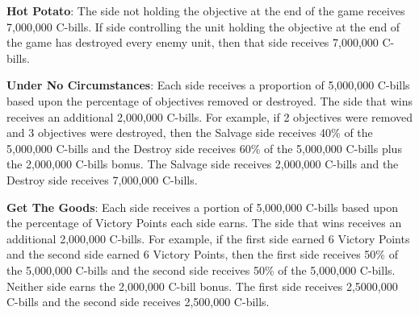 \begin{description}
\item {\bfseries Hot Potato}: The side not holding the objective at the end of the game receives 7,000,000 C-bills.
If side controlling the unit holding the objective at the end of the game has destroyed every enemy unit, then that side receives 7,000,000 C-bills.

\item {\bfseries Under No Circumstances}: Each side receives a proportion of 5,000,000 C-bills based upon the percentage of objectives removed or destroyed.
The side that wins receives an additional 2,000,000 C-bills.
For example, if 2 objectives were removed and 3 objectives were destroyed, then the Salvage side receives 40\% of the 5,000,000 C-bills and the Destroy side receives 60\% of the 5,000,000 C-bills plus the 2,000,000 C-bills bonus.
The Salvage side receives 2,000,000 C-bills and the Destroy side receives 7,000,000 C-bills.

\item {\bfseries Get The Goods}: Each side receives a portion of 5,000,000 C-bills based upon the percentage of Victory Points each side earns.
The side that wins receives an additional 2,000,000 C-bills.
For example, if the first side earned 6 Victory Points and the second side earned 6 Victory Points, then the first side receives 50\% of the 5,000,000 C-bills and the second side receives 50\% of the 5,000,000 C-bills.
Neither side earns the 2,000,000 C-bill bonus.
The first side receives 2,5000,000 C-bills and the second side receives 2,500,000 C-bills.

\end{description}
